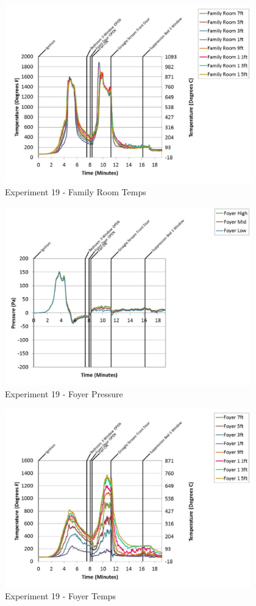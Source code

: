 \documentclass{article}
\begin{document}
\begin{appendices}
	\clearpage

	\begin{figure}[h!]
		\centering
		\includegraphics[height=3.05in]{0_Images/Results_Charts/Exp_19_Charts/FamilyRoomTemps.pdf}
		\caption{Experiment 19 - Family Room Temps}
	\end{figure}
 

	\begin{figure}[h!]
		\centering
		\includegraphics[height=3.05in]{0_Images/Results_Charts/Exp_19_Charts/FoyerPressure.pdf}
		\caption{Experiment 19 - Foyer Pressure}
	\end{figure}
 
	\clearpage

	\begin{figure}[h!]
		\centering
		\includegraphics[height=3.05in]{0_Images/Results_Charts/Exp_19_Charts/FoyerTemps.pdf}
		\caption{Experiment 19 - Foyer Temps}
	\end{figure}
 


\end{appendices}
\end{document}
